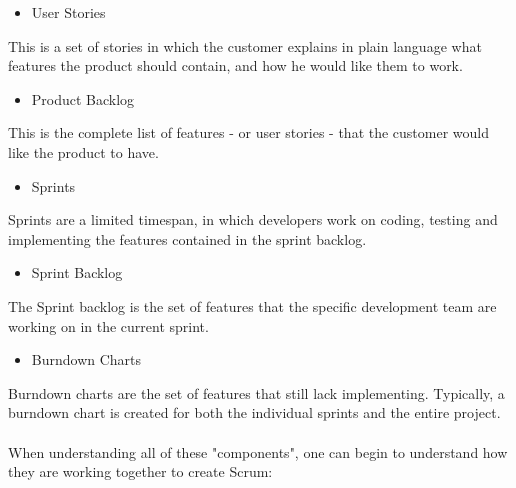 \begin{itemize}
	\item User Stories
\end{itemize}
This is a set of stories in which the customer explains in plain language what features the product should contain, and how he would like them to work.

\begin{itemize}
	\item Product Backlog
\end{itemize}
This is the complete list of features - or user stories - that the customer would like the product to have.

\begin{itemize}
	\item Sprints
\end{itemize}
Sprints are a limited timespan, in which developers work on coding, testing and implementing the features contained in the sprint backlog.

\begin{itemize}
	\item Sprint Backlog
\end{itemize}
The Sprint backlog is the set of features that the specific development team are working on in the current sprint.

\begin{itemize}
	\item Burndown Charts
\end{itemize}
Burndown charts are the set of features that still lack implementing. Typically, a burndown chart is created for both the individual sprints and the entire project.\\
\\
When understanding all of these "components", one can begin to understand how they are working together to create Scrum:

